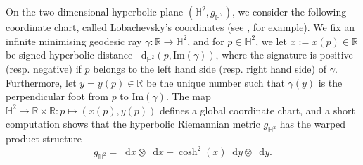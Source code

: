 \documentclass[11pt,twoside,a4paper]{article}
\newcommand*\diff{\mathop{}\!\mathrm{d}}
\newcommand{\R}{\mathbb{R}}
\newcommand{\bbH}{\mathbb{H}}
\theoremstyle{theorem}
\theoremstyle{definition}
\theoremstyle{remark}
\theoremstyle{proof}
\begin{document}
On the two-dimensional hyperbolic plane $(\bbH^2, g_{\bbH^2})$, we consider the following coordinate chart, called Lobachevsky's coordinates (see \cite[Section 33.1]{Martin-book}, for example).
We fix an infinite minimising geodesic ray $\gamma : \R \to \bbH^2$, and for $p \in \bbH^2$, we let $x := x(p) \in \R$ be signed hyperbolic distance $\diff_{\bbH^2}(p, \mathrm{Im}(\gamma))$,
where the signature is positive (resp. negative) if $p$ belongs to the left hand side (resp. right hand side) of $\gamma$. Furthermore, let $y=y(p)\in \R$ be the unique number such that $\gamma(y)$ is the perpendicular foot from $p$ to $\mathrm{Im}(\gamma)$. The map $\bbH^2 \to \R \times \R : p \mapsto (x(p), y(p))$ defines a global coordinate chart, and a short computation shows that the hyperbolic Riemannian metric $g_{\bbH^2}$ has the warped product structure
\[
g_{\bbH^2} = \diff x\otimes \diff x+\cosh^2(x)\diff y\otimes \diff y.
\]
\end{document}
